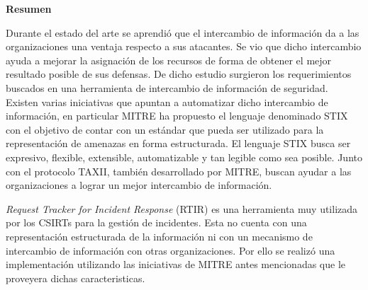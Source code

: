 {\huge \bfseries Resumen \\[0.4cm]}

Durante el estado del arte se aprendió que el intercambio de información da a las organizaciones una ventaja respecto a sus atacantes. Se vio que dicho intercambio ayuda a mejorar la asignación de los recursos de forma de obtener el mejor resultado posible de sus defensas. De dicho estudio surgieron los requerimientos buscados en una herramienta de intercambio de información de seguridad. \\

Existen varias iniciativas que apuntan a automatizar dicho intercambio de información, en particular MITRE \cite{mitre} ha propuesto el lenguaje denominado STIX con el objetivo de contar con un estándar que pueda ser utilizado para la representación  de amenazas en forma estructurada. El lenguaje STIX busca ser expresivo, flexible, extensible, automatizable y tan legible como sea posible. Junto con el protocolo TAXII, también desarrollado por MITRE, buscan ayudar a las organizaciones a lograr un mejor intercambio de información.

\textit{Request Tracker for Incident Response} (RTIR) es una herramienta muy utilizada por los CSIRTs para la gestión de incidentes. Esta no cuenta con una representación estructurada de la información ni con un mecanismo de intercambio de información con otras organizaciones. Por ello se realizó una implementación utilizando las iniciativas de MITRE antes mencionadas que le proveyera dichas caracteristicas.

